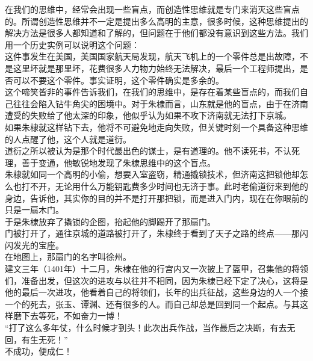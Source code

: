 \begin{multicols}{\theparacolNo}
在我们的思维中，经常会出现一些盲点，而创造性思维就是专门来消灭这些盲点的。所谓创造性思维并不一定是提出多么高明的主意，很多时候，这种思维提出的解决方法是很多人都知道和了解的，但问题在于他们都没有意识到这些方法。我们用一个历史实例可以说明这个问题：\\

这件事发生在美国，美国国家航天局发现，航天飞机上的一个零件总是出故障，不是这里坏就是那里坏，花费很多人力物力始终无法解决，最后一个工程师提出，是否可以不要这个零件。事实证明，这个零件确实是多余的。\\

这个啼笑皆非的事件告诉我们，在我们的思维中，是存在着某些盲点的，而我们自己往往会陷入钻牛角尖的困境中。对于朱棣而言，山东就是他的盲点，由于在济南遭受的失败给了他太深的印象，他似乎认为如果不攻下济南就无法打下京城。\\

如果朱棣就这样钻下去，他将不可避免地走向失败，但关键时刻一个具备这种思维的人点醒了他，这个人就是道衍。\\

道衍之所以被认为是那个时代最出色的谋士，是有道理的。他不读死书，不认死理，善于变通，他敏锐地发现了朱棣思维中的这个盲点。\\

朱棣就如同一个高明的小偷，想要入室盗窃，精通撬锁技术，但济南这把锁他却怎么也打不开，无论用什么万能钥匙费多少时间也无济于事。此时老偷道衍来到他的身边，告诉他，其实你的目的并不是打开那把锁，而是进入门内，现在在你眼前的只是一扇木门。\\

于是朱棣放弃了撬锁的企图，抬起他的脚踢开了那扇门。\\

门被打开了，通往京城的道路被打开了，朱棣终于看到了天子之路的终点——那闪闪发光的宝座。\\

在地图上，那扇门的名字叫徐州。\\

建文三年（1401年）十二月，朱棣在他的行宫内又一次披上了盔甲，召集他的将领们，准备出发，但这次的进攻与以往并不相同，因为朱棣已经下定了决心，这将是他的最后一次进攻，他看着自己的将领们，长年的出兵征战，这些身边的人一个接一个的死去，张玉、谭渊、还有很多的人。而自己却总是回到同一个起点。与其这样磨下去等死，不如奋力一博！\\

“打了这么多年仗，什么时候才到头！此次出兵作战，当作最后之决断，有去无回，有生无死！”\\

不成功，便成仁！\\


\end{multicols}
